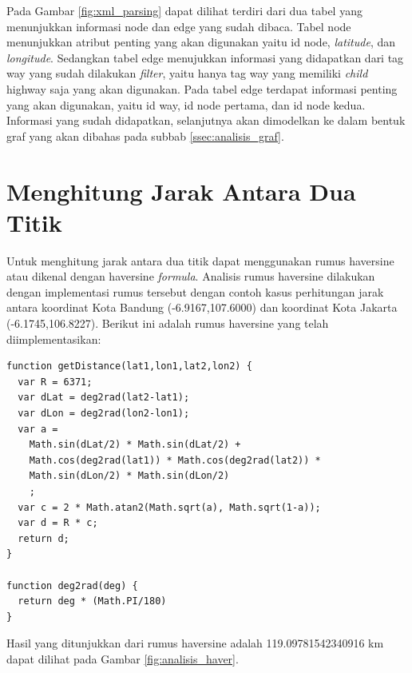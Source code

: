 Pada Gambar \ref{fig:xml_parsing} dapat dilihat terdiri dari dua tabel yang
menunjukkan informasi node dan edge yang sudah dibaca. Tabel node menunjukkan
atribut penting yang akan digunakan yaitu id node, \textit{latitude}, dan
\textit{longitude}. Sedangkan tabel edge menujukkan informasi yang didapatkan
dari tag way yang sudah dilakukan \textit{filter}, yaitu hanya tag way yang
memiliki \textit{child} highway saja yang akan digunakan. Pada tabel edge
terdapat informasi penting yang akan digunakan, yaitu id way, id node pertama, 
dan id node kedua. Informasi yang sudah didapatkan, selanjutnya akan dimodelkan
ke dalam bentuk graf yang akan dibahas pada subbab \ref{ssec:analisis_graf}.

\section{Menghitung Jarak Antara Dua Titik}
Untuk menghitung jarak antara dua titik dapat menggunakan rumus haversine atau
dikenal dengan haversine \textit{formula}. Analisis rumus haversine dilakukan
dengan implementasi rumus tersebut dengan contoh kasus perhitungan
jarak antara koordinat Kota Bandung (-6.9167,107.6000) dan koordinat Kota
Jakarta (-6.1745,106.8227). Berikut ini adalah rumus haversine yang telah
diimplementasikan:
\begin{verbatim}
function getDistance(lat1,lon1,lat2,lon2) {
  var R = 6371; 
  var dLat = deg2rad(lat2-lat1); 
  var dLon = deg2rad(lon2-lon1); 
  var a = 
    Math.sin(dLat/2) * Math.sin(dLat/2) +
    Math.cos(deg2rad(lat1)) * Math.cos(deg2rad(lat2)) * 
    Math.sin(dLon/2) * Math.sin(dLon/2)
    ; 
  var c = 2 * Math.atan2(Math.sqrt(a), Math.sqrt(1-a)); 
  var d = R * c; 
  return d;
}

function deg2rad(deg) {
  return deg * (Math.PI/180)
}
\end{verbatim}
Hasil yang ditunjukkan dari rumus haversine adalah 119.09781542340916 km dapat
dilihat pada Gambar \ref{fig:analisis_haver}.

